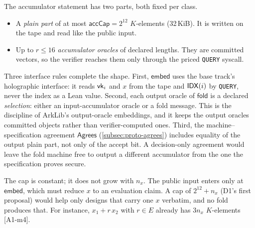 The accumulator statement has two parts, both fixed per class.
\begin{itemize}[nosep]
\item A \emph{plain part} of at most $\mathsf{accCap}=2^{12}$ $K$-elements (32\,KiB). It is written
  on the tape and read like the public input.
\item Up to $r\le16$ \emph{accumulator oracles} of declared lengths. They are committed vectors, so
  the verifier reaches them only through the priced \texttt{QUERY} syscall.
\end{itemize}
Three interface rules complete the shape. First, $\mathsf{embed}$ uses the base track's holographic
interface: it reads $\mathsf{vk}_i$ and $x$ from the tape and $\mathsf{IDX}(i)$ by \texttt{QUERY}, never the index
as a Lean value. Second, each output oracle of $\mathsf{fold}$ is a declared \emph{selection}: either
an input-accumulator oracle or a fold message. This is the discipline of ArkLib's output-oracle
embeddings, and it keeps the output oracles committed objects rather than verifier-computed ones.
Third, the machine--specification agreement $\mathsf{Agrees}$ (\cref{subsec:proto-agrees}) includes
equality of the output plain part, not only of the accept bit. A decision-only agreement would leave
the fold machine free to output a different accumulator from the one the specification proves secure.

The cap is constant; it does not grow with $n_x$. The public input enters only at $\mathsf{embed}$,
which must reduce $x$ to an evaluation claim. A cap of $2^{12}+n_x$ (D1's first proposal) would help
only designs that carry one $x$ verbatim, and no fold produces that. For instance, $x_1+r\,x_2$ with
$r\in E$ already has $3n_x$ $K$-elements [A1-m4].

